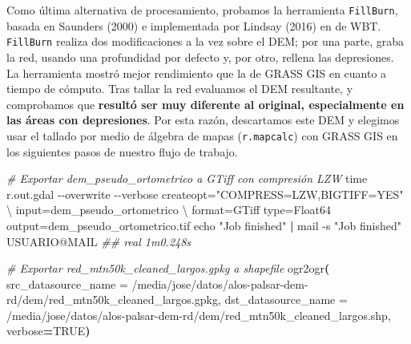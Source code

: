 \documentclass[spanish]{article}
\newenvironment{Shaded}{\begin{snugshade}}{\end{snugshade}}
\newcommand{\AttributeTok}[1]{\textcolor[rgb]{0.77,0.63,0.00}{#1}}
\newcommand{\BuiltInTok}[1]{#1}
\newcommand{\CommentTok}[1]{\textcolor[rgb]{0.56,0.35,0.01}{\textit{#1}}}
\newcommand{\DataTypeTok}[1]{\textcolor[rgb]{0.13,0.29,0.53}{#1}}
\newcommand{\ErrorTok}[1]{\textcolor[rgb]{0.64,0.00,0.00}{\textbf{#1}}}
\newcommand{\ExtensionTok}[1]{#1}
\newcommand{\KeywordTok}[1]{\textcolor[rgb]{0.13,0.29,0.53}{\textbf{#1}}}
\newcommand{\NormalTok}[1]{#1}
\newcommand{\OperatorTok}[1]{\textcolor[rgb]{0.81,0.36,0.00}{\textbf{#1}}}
\newcommand{\StringTok}[1]{\textcolor[rgb]{0.31,0.60,0.02}{#1}}
\newcommand{\VariableTok}[1]{\textcolor[rgb]{0.00,0.00,0.00}{#1}}
\begin{document}
Como última alternativa de procesamiento, probamos la herramienta
\texttt{FillBurn}, basada en Saunders (2000) e implementada por Lindsay
(2016) en de WBT. \texttt{FillBurn} realiza dos modificaciones a la vez
sobre el DEM; por una parte, graba la red, usando una profundidad por
defecto y, por otro, rellena las depresiones. La herramienta mostró
mejor rendimiento que la de GRASS GIS en cuanto a tiempo de cómputo.
Tras tallar la red evaluamos el DEM resultante, y comprobamos que
\textbf{resultó ser muy diferente al original, especialmente en las
áreas con depresiones}. Por esta razón, descartamos este DEM y elegimos
usar el tallado por medio de álgebra de mapas (\texttt{r.mapcalc}) con
GRASS GIS en los siguientes pasos de nuestro flujo de trabajo.

\begin{Shaded}
\begin{Highlighting}[]
\CommentTok{\# Exportar dem\_pseudo\_ortometrico a GTiff con compresión LZW}
\BuiltInTok{time}\NormalTok{ r.out.gdal }\AttributeTok{{-}{-}overwrite} \AttributeTok{{-}{-}verbose}\NormalTok{ createopt=}\StringTok{"COMPRESS=LZW,BIGTIFF=YES"} \DataTypeTok{\textbackslash{}}
\NormalTok{ input=dem\_pseudo\_ortometrico }\DataTypeTok{\textbackslash{}}
\NormalTok{ format=GTiff type=Float64 output=dem\_pseudo\_ortometrico.tif}
\BuiltInTok{echo} \StringTok{"Job finished"} \KeywordTok{|} \ExtensionTok{mail} \AttributeTok{{-}s} \StringTok{"Job finished"}\NormalTok{ USUARIO@MAIL}
\CommentTok{\#\# real 1m0.248s}

\CommentTok{\# Exportar red\_mtn50k\_cleaned\_largos.gpkg a shapefile}
\ExtensionTok{ogr2ogr}\ErrorTok{(}
  \ExtensionTok{src\_datasource\_name}\NormalTok{ = }\StringTok{\textquotesingle{}/media/jose/datos/alos{-}palsar{-}dem{-}rd/dem/red\_mtn50k\_cleaned\_largos.gpkg\textquotesingle{}}\NormalTok{,}
  \ExtensionTok{dst\_datasource\_name}\NormalTok{ = }\StringTok{\textquotesingle{}/media/jose/datos/alos{-}palsar{-}dem{-}rd/dem/red\_mtn50k\_cleaned\_largos.shp\textquotesingle{}}\NormalTok{,}
  \VariableTok{verbose}\OperatorTok{=}\NormalTok{TRUE}\KeywordTok{)}


\end{Highlighting}
\end{Shaded}
\end{document}
